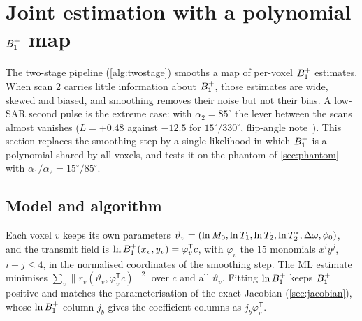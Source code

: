 \section{Joint estimation with a polynomial \texorpdfstring{$B_1^{+}$}{B1} map}\label{sec:polyb1}

The two-stage pipeline (\cref{alg:twostage}) smooths a map of per-voxel $B_1^{+}$ estimates. When
scan 2 carries little information about $B_1^{+}$, those estimates are wide, skewed and biased,
and smoothing removes their noise but not their bias. A low-SAR second pulse is the extreme
case: with $\alpha_2=85^\circ$ the lever between the scans almost vanishes ($L=+0.48$ against
$-12.5$ for $15^\circ/330^\circ$, flip-angle note~\cite{flipnote}). This section replaces the
smoothing step by a single likelihood in which $B_1^{+}$ is a polynomial shared by all voxels, and
tests it on the phantom of \cref{sec:phantom} with $\alpha_1/\alpha_2=15^\circ/85^\circ$.

\subsection{Model and algorithm}

Each voxel $v$ keeps its own parameters
$\vartheta_v=(\ln M_0,\ln T_1,\ln T_2,\ln T_2^{*},\Delta\omega,\phi_0)$, and the transmit field is $\ln B_1^{+}(x_v,y_v)=\varphi_v^{\mathsf T}c$, with $\varphi_v$ the $15$ monomials
$x^iy^j$, $i+j\le4$, in the normalised coordinates of the smoothing step. The ML estimate
minimises $\sum_v\|r_v(\vartheta_v,\varphi_v^{\mathsf T}c)\|^2$ over $c$ and all $\vartheta_v$.
Fitting $\ln B_1^{+}$ keeps $B_1^{+}$ positive and matches the parameterisation of the exact Jacobian
(\cref{sec:jacobian}), whose $\ln B_1^{+}$ column $j_b$ gives the coefficient columns as $j_b\varphi_v^{\mathsf T}$.

